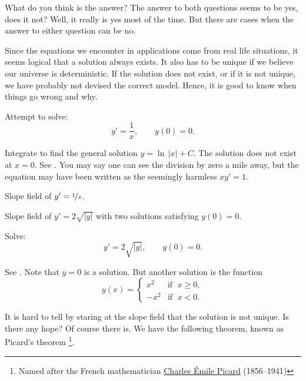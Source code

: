 What do you think is the answer?
The answer to both questions seems to be yes, does it not?
Well, it really is yes most of the time.  But there
are cases when the answer to either question can be no.

Since the equations we encounter in applications
come from real life situations, it seems
logical that a solution always exists.
It also has to be unique if we believe our
universe is deterministic.  If the solution does not exist, or if it is
not unique, we have
probably not devised the correct model.  Hence, it is good to know
when things go wrong and why.

\begin{example}
Attempt to solve:
\begin{equation*}
y' = \frac{1}{x}, \qquad y(0) = 0 .
\end{equation*}

Integrate to find the general solution $y = \ln \, \lvert x \rvert + C$.  The
solution does not exist at $x=0$.  See .
You may say one can see the division by zero a mile away, but
the equation may have been written as the seemingly harmless $x y' = 1$.

\begin{myfig}
\parbox[t]{3in}{
 \capstart
 \caption{Slope field of $y' = \nicefrac{1}{x}$.\label{1.3:xinvfig}}
}
\quad
\parbox[t]{3in}{
 \capstart
 \caption{Slope field of $y' = 2 \sqrt{\lvert y \rvert}$ with two
 solutions satisfying $y(0) = 0$.\label{1.3:sqrtfig}}
}
\end{myfig}
\end{example}

\begin{example}
Solve:
\begin{equation*}
y' = 2 \sqrt{\lvert y \rvert}, \qquad y(0) = 0 .
\end{equation*}

See .
Note that $y=0$ is a solution.  But another solution is the function
\begin{equation*}
y(x) =
\begin{cases}
x^2 & \text{if } \; x \geq 0,\\
-x^2 & \text{if } \; x < 0.
\end{cases}
\end{equation*}
\end{example}

It is hard to tell by staring at the slope field that the
solution is not
unique.
Is there any hope?
Of course there is.  We have the following theorem,
known as Picard's theorem%
\footnote{Named after the French mathematician
\href{https://en.wikipedia.org/wiki/Charles_\%C3\%89mile_Picard}{Charles \'Emile Picard}
(1856--1941)}. 

